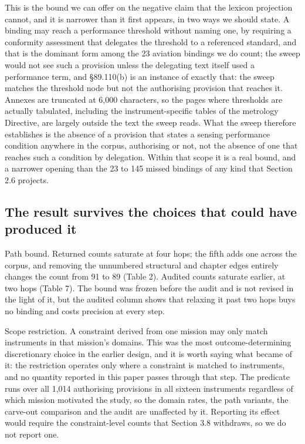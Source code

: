 This is the bound we can offer on the negative claim that the lexicon projection cannot, and it is narrower than it first appears, in two ways we should state. A binding may reach a performance threshold without naming one, by requiring a conformity assessment that delegates the threshold to a referenced standard, and that is the dominant form among the 23 aviation bindings we do count; the sweep would not see such a provision unless the delegating text itself used a performance term, and \S{}89.110(b) is an instance of exactly that: the sweep matches the threshold node but not the authorising provision that reaches it. Annexes are truncated at 6,000 characters, so the pages where thresholds are actually tabulated, including the instrument-specific tables of the metrology Directive, are largely outside the text the sweep reads. What the sweep therefore establishes is the absence of a provision that states a sensing performance condition anywhere in the corpus, authorising or not, not the absence of one that reaches such a condition by delegation. Within that scope it is a real bound, and a narrower opening than the 23 to 145 missed bindings of any kind that Section 2.6 projects.

\subsection{The result survives the choices that could have produced it}\label{sec:3.7}

Path bound. Returned counts saturate at four hops; the fifth adds one across the corpus, and removing the unnumbered structural and chapter edges entirely changes the count from 91 to 89 (Table 2). Audited counts saturate earlier, at two hops (Table 7). The bound was frozen before the audit and is not revised in the light of it, but the audited column shows that relaxing it past two hops buys no binding and costs precision at every step.

Scope restriction. A constraint derived from one mission may only match instruments in that mission's domains. This was the most outcome-determining discretionary choice in the earlier design, and it is worth saying what became of it: the restriction operates only where a constraint is matched to instruments, and no quantity reported in this paper passes through that step. The predicate runs over all 1,014 authorising provisions in all sixteen instruments regardless of which mission motivated the study, so the domain rates, the path variants, the carve-out comparison and the audit are unaffected by it. Reporting its effect would require the constraint-level counts that Section 3.8 withdraws, so we do not report one.

